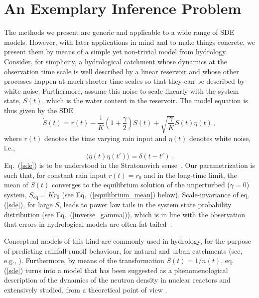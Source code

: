 \documentclass[12pt,a4paper,final]{iopart}
\newcommand{\eq}{\mbox{eq}}
\begin{document}
\section{An Exemplary Inference Problem}

The methods we present are generic and applicable to a wide range of SDE models.
However, with later applications in mind and to make things concrete, we present them by means of a simple yet non-trivial model from hydrology.
Consider, for simplicity, a hydrological catchment whose dynamics at the observation time scale is well described by a linear reservoir and whose other processes happen at much shorter time scales so that they can be described by white noise.
Furthermore, assume this noise to scale linearly with the system state, $S(t)$, which is the water content in the reservoir.
The model equation is thus given by the SDE
\begin{equation}\label{sde}
\dot{S}(t) = r(t) - \frac{1}{K}\left(1+\frac{\gamma}{2}\right) S(t)
+
\sqrt{\frac{\gamma}{K}} S(t){\eta}(t)\,,
\end{equation}
where $r(t)$ denotes the time varying rain input and $\eta(t)$ denotes white noise, i.e.,
\begin{equation}\label{whitenoise}
\langle\eta(t)\eta(t')\rangle = \delta(t-t')\,.
\end{equation}
Eq.~(\ref{sde}) is to be understood in the Stratonovich sense~\cite{stratonovich_1968}.
Our parametrization is such that, for constant rain input $r(t)=r_0$ and in the long-time limit, the mean of $S(t)$ converges to the equilibrium solution of the unperturbed ($\gamma=0$) system, $S_{\eq}=Kr_0$ (see Eq.~(\ref{equilibrium_mean}) below).
Scale-invariance of eq. (\ref{sde}), for large $S$, leads to power law tails in the system state probability distribution (see Eq.~(\ref{inverse_gamma})), which is in line with the observation that errors in hydrological models are often fat-tailed~\cite{thyer_2009_fattails}.

Conceptual models of this kind are commonly used in hydrology, for the purpose of predicting rainfall-runoff behaviour, for natural and urban catchments (see, e.g., \cite{breinholt_2011_SDE}).
Furthermore, by means of the transformation $S(t)=1/n(t)$, eq. (\ref{sde}) turns into a model that has been suggested as a phenomenological description of the dynamics of the neutron density in nuclear reactors \cite{dutre_1977_SDE} and extensively studied, from a theoretical point of view \cite{schenzle_1979_multStochProc, fujisaka_1986_intermittency}.
\end{document}
